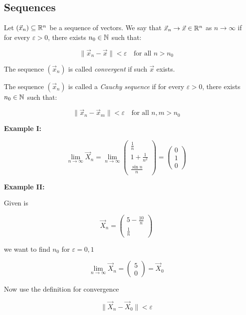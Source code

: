 \subsection{Sequences}

Let \( (\vec{x}_n) \subseteq \mathbb{R}^n \) be a sequence of vectors. We say that 
\( \vec{x}_n \to \vec{x} \in \mathbb{R}^n \) as \( n \to \infty \) if for every \( \varepsilon > 0 \), 
there exists \( n_0 \in \mathbb{N} \) such that:
    
\[
    \|\vec{x}_n - \vec{x}\| < \varepsilon \quad \text{for all } n > n_0
\]

The sequence \( (\vec{x}_n) \) is called \emph{convergent} if such \( \vec{x} \) exists.

The sequence \( (\vec{x}_n) \) is called a \emph{Cauchy sequence} if for every \( \varepsilon > 0 \), 
there exists \( n_0 \in \mathbb{N} \) such that:

\[
    \|\vec{x}_n - \vec{x}_m\| < \varepsilon \quad \text{for all } n, m > n_0
\]

\textbf{Example I:}

\[
    \lim_{n \to \infty} \vec{X}_n = \lim_{n \to \infty} \begin{pmatrix} \frac{1}{n} \\
    1 + \frac{1}{n^2} \\ \frac{\sin n}{n}\end{pmatrix} = \begin{pmatrix}
        0 \\ 1 \\ 0
    \end{pmatrix}
\]

\textbf{Example II:}
\vspace{\baselineskip}

Given is

\[
    \vec{X}_n = 
    \begin{pmatrix}
    5 - \frac{10}{n}\\
    \frac{1}{n}   
    \end{pmatrix}
\]

we want to find \(n_0\) for \(\varepsilon = 0,1\)

\[
    \lim_{n \to \infty} \vec{X}_n = 
    \begin{pmatrix}
    5 \\
    0
    \end{pmatrix}
    = \vec{X}_0
\]

Now use the definition for convergence

\[
    \|\vec{X}_n - \vec{X}_0\| < \varepsilon
\]

